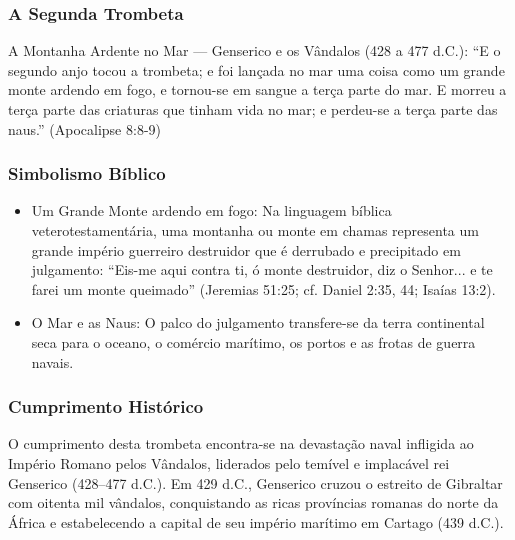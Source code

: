 \subsubsection*{A Segunda Trombeta}
A Montanha Ardente no Mar — Genserico e os Vândalos (428 a 477 d.C.):
``E o segundo anjo tocou a trombeta; e foi lançada no mar uma coisa como um grande monte ardendo em fogo, e tornou-se em sangue a terça parte do mar. E morreu a terça parte das criaturas que tinham vida no mar; e perdeu-se a terça parte das naus.'' (Apocalipse 8:8-9)


\subsubsection*{Simbolismo Bíblico}
\begin{itemize}
  \item Um Grande Monte ardendo em fogo: Na linguagem bíblica veterotestamentária, uma montanha ou monte em chamas representa um grande império guerreiro destruidor que é derrubado e precipitado em julgamento: ``Eis-me aqui contra ti, ó monte destruidor, diz o Senhor... e te farei um monte queimado'' (Jeremias 51:25; cf. Daniel 2:35, 44; Isaías 13:2).
  \item O Mar e as Naus: O palco do julgamento transfere-se da terra continental seca para o oceano, o comércio marítimo, os portos e as frotas de guerra navais.
\end{itemize}



\subsubsection*{Cumprimento Histórico}
O cumprimento desta trombeta encontra-se na devastação naval infligida ao Império Romano pelos Vândalos, liderados pelo temível e implacável rei Genserico (428–477 d.C.). Em 429 d.C., Genserico cruzou o estreito de Gibraltar com oitenta mil vândalos, conquistando as ricas províncias romanas do norte da África e estabelecendo a capital de seu império marítimo em Cartago (439 d.C.).


